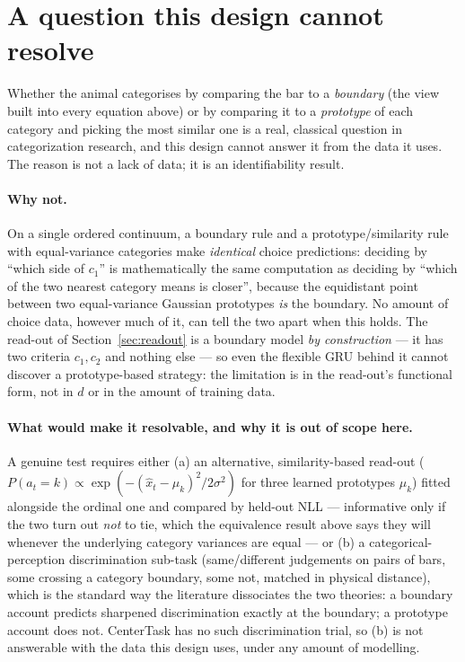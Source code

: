 \documentclass[11pt,a4paper]{article}
\begin{document}
\section{A question this design cannot resolve}
\label{sec:limits}

Whether the animal categorises by comparing the bar to a \emph{boundary} (the view built
into every equation above) or by comparing it to a \emph{prototype} of each category and
picking the most similar one is a real, classical question in categorization research,
and this design cannot answer it from the data it uses. The reason is not a lack of
data; it is an identifiability result.

\paragraph{Why not.} On a single ordered continuum, a boundary rule and a
prototype/similarity rule with equal-variance categories make \emph{identical}
choice predictions: deciding by ``which side of $c_1$'' is mathematically the same
computation as deciding by ``which of the two nearest category means is closer'', because
the equidistant point between two equal-variance Gaussian prototypes \emph{is} the
boundary. No amount of choice data, however much of it, can tell the two apart when this
holds. The read-out of Section~\ref{sec:readout} is a boundary model \emph{by
construction} — it has two criteria $c_1, c_2$ and nothing else — so even the flexible
GRU behind it cannot discover a prototype-based strategy: the limitation is in the
read-out's functional form, not in $d$ or in the amount of training data.

\paragraph{What would make it resolvable, and why it is out of scope here.} A genuine
test requires either (a) an alternative, similarity-based read-out
($P(a_t = k) \propto \exp(-(\hat x_t - \mu_k)^2 / 2\sigma^2)$ for three learned prototypes
$\mu_k$) fitted alongside the ordinal one and compared by held-out NLL — informative only
if the two turn out \emph{not} to tie, which the equivalence result above says they will
whenever the underlying category variances are equal — or (b) a categorical-perception
discrimination sub-task (same/different judgements on pairs of bars, some crossing a
category boundary, some not, matched in physical distance), which is the standard way
the literature dissociates the two theories: a boundary account predicts sharpened
discrimination exactly at the boundary; a prototype account does not. CenterTask has no
such discrimination trial, so (b) is not answerable with the data this design uses, under
any amount of modelling.
\end{document}
